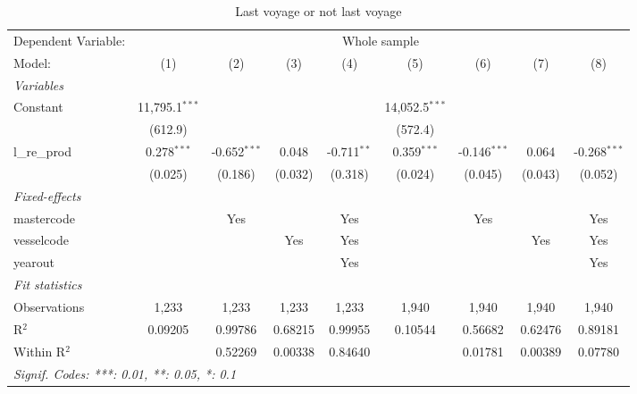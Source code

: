 
\begin{table}[htbp]
   \caption{\label{tab:n_voyage} Last voyage or not last voyage}
   \centering
   \begin{tabular}{lcccccccc}
      \tabularnewline \midrule \midrule
      Dependent Variable: & \multicolumn{8}{c}{Whole sample }\\
      Model:        & (1)              & (2)            & (3)     & (4)           & (5)              & (6)            & (7)     & (8)\\  
      \midrule
      \emph{Variables}\\
      Constant      & 11,795.1$^{***}$ &                &         &               & 14,052.5$^{***}$ &                &         &   \\   
                    & (612.9)          &                &         &               & (572.4)          &                &         &   \\   
      l\_re\_prod   & 0.278$^{***}$    & -0.652$^{***}$ & 0.048   & -0.711$^{**}$ & 0.359$^{***}$    & -0.146$^{***}$ & 0.064   & -0.268$^{***}$\\   
                    & (0.025)          & (0.186)        & (0.032) & (0.318)       & (0.024)          & (0.045)        & (0.043) & (0.052)\\   
      \midrule
      \emph{Fixed-effects}\\
      mastercode    &                  & Yes            &         & Yes           &                  & Yes            &         & Yes\\  
      vesselcode    &                  &                & Yes     & Yes           &                  &                & Yes     & Yes\\  
      yearout       &                  &                &         & Yes           &                  &                &         & Yes\\  
      \midrule
      \emph{Fit statistics}\\
      Observations  & 1,233            & 1,233          & 1,233   & 1,233         & 1,940            & 1,940          & 1,940   & 1,940\\  
      R$^2$         & 0.09205          & 0.99786        & 0.68215 & 0.99955       & 0.10544          & 0.56682        & 0.62476 & 0.89181\\  
      Within R$^2$  &                  & 0.52269        & 0.00338 & 0.84640       &                  & 0.01781        & 0.00389 & 0.07780\\  
      \midrule \midrule
      \multicolumn{9}{l}{\emph{Signif. Codes: ***: 0.01, **: 0.05, *: 0.1}}\\
   \end{tabular}
\end{table}


